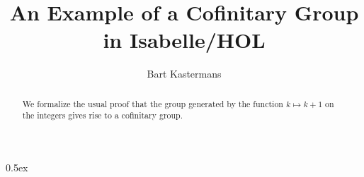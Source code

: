 \documentclass[11pt,a4paper]{article}
\begin{document}
\title{An Example of a Cofinitary Group in Isabelle/HOL}
\author{Bart Kastermans}

\maketitle

\begin{abstract}
  We formalize the usual proof that the group generated by the
  function $k \mapsto k + 1$ on the integers gives rise to a
  cofinitary group.
\end{abstract}

\tableofcontents

\vspace {.3cm}

\parindent 0pt\parskip 0.5ex





\end{document}
